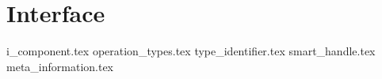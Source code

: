 \section{Interface}
{i_component.tex}
{operation_types.tex}
{type_identifier.tex}
{smart_handle.tex}
{meta_information.tex}
